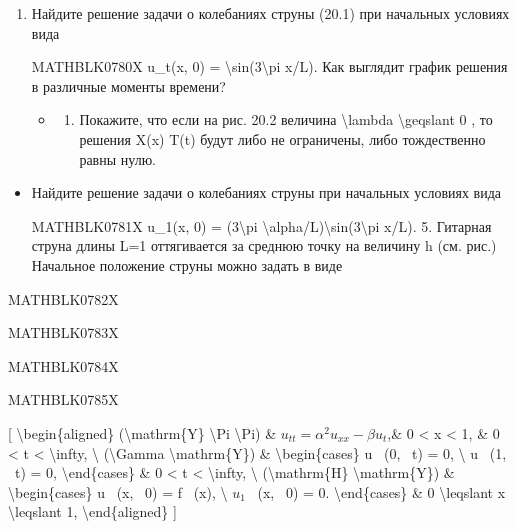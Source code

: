 \documentclass[
]{article}
\providecommand{\tightlist}{%
  \setlength{\itemsep}{0pt}\setlength{\parskip}{0pt}}
\begin{document}
{{\begin{enumerate}
\def\labelenumi{\arabic{enumi}.}
\setcounter{enumi}{1}
\item
  Найдите решение задачи о колебаниях струны (20.1) при начальных
  условиях вида

  MATHBLK0780X u\_t(x, 0) = \textbackslash sin(3\textbackslash pi x/L).
  Как выглядит график решения в различные моменты времени?

  \begin{itemize}
  \tightlist
  \item
    \begin{enumerate}
    \def\labelenumii{\arabic{enumii}.}
    \setcounter{enumii}{2}
    \tightlist
    \item
      Покажите, что если на рис. 20.2 величина \textbackslash lambda
      \textbackslash geqslant 0 , то решения X(x) T(t) будут либо не
      ограничены, либо тождественно равны нулю.
    \end{enumerate}
  \end{itemize}
\end{enumerate}

\begin{itemize}
\item
  Найдите решение задачи о колебаниях струны при начальных условиях вида

  MATHBLK0781X u\_1(x, 0) = (3\textbackslash pi
  \textbackslash alpha/L)\textbackslash sin(3\textbackslash pi x/L). 5.
  Гитарная струна длины L=1 оттягивается за среднюю точку на величину h
  (см. рис.) Начальное положение струны можно задать в виде
\end{itemize}

MATHBLK0782X

MATHBLK0783X

MATHBLK0784X

MATHBLK0785X

{[} \textbackslash begin\{aligned\} (\textbackslash mathrm\{Y\}
\textbackslash Pi \textbackslash Pi) \&
\(u_{tt} = \alpha^2 u_{xx} - \beta u_t\),\& 0 \textless{} x \textless{}
1, \& 0 \textless{} t \textless{} \textbackslash infty, \textbackslash{}
(\textbackslash Gamma \textbackslash mathrm\{Y\}) \&
\textbackslash begin\{cases\} u ~(0, ~t) = 0, \textbackslash{} u ~(1,
~t) = 0, \textbackslash end\{cases\} \& 0 \textless{} t \textless{}
\textbackslash infty, \textbackslash{} (\textbackslash mathrm\{H\}
\textbackslash mathrm\{Y\}) \& \textbackslash begin\{cases\} u ~(x, ~0)
= f ~(x), \textbackslash{} \(u_1\) ~(x, ~0) = 0.
\textbackslash end\{cases\} \& 0 \textbackslash leqslant x
\textbackslash leqslant 1, \textbackslash end\{aligned\} {]}

}}
\end{document}
